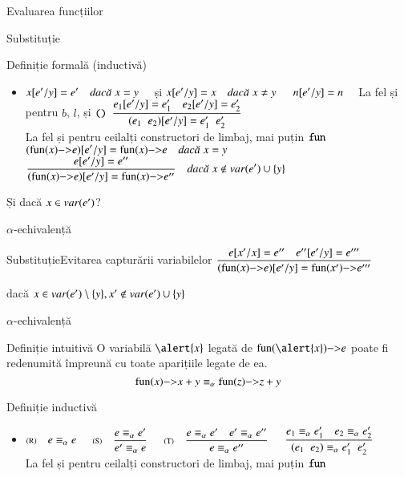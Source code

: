 \documentclass[xcolor=pdftex,romanian,colorlinks]{beamer}
\begin{document}
\begin{section}{Evaluarea funcțiilor}
\begin{subsection}{Substituție}
\begin{frame}{Definiție formală (inductivă)}
\begin{itemize}
\item[] $\displaystyle\reg{x[e' / y] = e'}{}{x = y}$ \hfill și \hfill
 $\displaystyle\reg{x[e' / y] = x}{}{x \neq y}$
\vitem[] $\displaystyle\reg{n[e' / y] = n}{}{}$
 \hfill La fel și pentru $b$, $l$, și $\mathrel{\text{\ttfamily ()}}$
\vitem[] $\displaystyle\reg{(e_1\mathrel{} e_2)[e' / y] = e_1'\mathrel{} e_2'}{e_1[e'/y] = e_1' \si e_2[e'/y] = e_2'}{}$  
\\La fel și pentru ceilalți constructori de limbaj, mai puțin $\mathrel{\text{\ttfamily fun}}$ 
\vitem[]  $\displaystyle\reg{(\fun{x}{e})[e' / y] = \fun{x}{e}}{}{x = y}$ 
\vitem[] $\displaystyle\reg{(\fun{x}{e})[e' / y] = \fun{x}{e''}}{e[e'/y] = e''}{x \not \in \var(e')\cup \{y\}}$
\end{itemize}
\alert{Și dacă $x \in  \mathop{var}(e')$?}
\end{frame}
\end{subsection}

\begin{subsection}{$\alpha$-echivalență}


\begin{frame}{Substituție}{Evitarea capturării variabilelor}
$\displaystyle\reg{(\fun{x}{e})[e' / y] = \fun{x'}{e'''}}{e[x'/x] = e'' \si e''[e'/y] = e'''}{}$

\hfill dacă $x \in \mathop{var}(e')\setminus \{y\}, x' \not\in \mathop{var}(e')\cup\{y\}$

\end{frame}

\begin{frame}{$\alpha$-echivalență}
\begin{block}{Definiție intuitivă}
O variabilă $\alert{x}$ legată de $\fun{\alert{x}}{e}$ poate fi redenumită împreună cu toate aparițiile legate de ea.
\[\fun{x}{x + y} \equiv_\alpha \fun{z}{z + y}\] 
\end{block}
\end{frame}



\begin{frame}{Definiție inductivă}
\begin{itemize}
\item[] $\displaystyle\reg[R]{e \equiv_\alpha e}{}{}$ \hfill \;\hfill  $\displaystyle\reg[S]{e' \equiv_\alpha e}{e \equiv_\alpha e'}{}$ \hfill\;\hfill $\displaystyle\reg[T]{e \equiv_\alpha e''}{e \equiv_\alpha e' \si e'  \equiv_\alpha e'' }{}$\hfill\;
\vitem[] $\displaystyle\reg{(e_1\mathrel{} e_2) \equiv_\alpha e_1'\mathrel{} e_2'}{e_1 \equiv_\alpha  e_1' \si e_2 \equiv_\alpha e_2'}{}$  
\\La fel și pentru ceilalți constructori de limbaj, mai puțin $\mathrel{\text{\ttfamily fun}}$ 


\end{itemize}
\end{frame}
\end{subsection}
\end{section}
\end{document}
